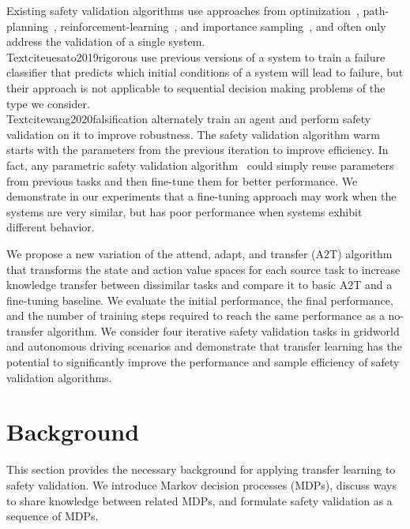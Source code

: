 Existing safety validation algorithms use approaches from optimization~\cite{Mathesen2019falsification}, path-planning~\cite{zutshi2014multiple}, reinforcement-learning~\cite{lee2015adaptive}, and importance sampling~\cite{huang2017accelerated}, and often only address the validation of a single system. \\Textcite{uesato2019rigorous} use previous versions of a system to train a failure classifier that predicts which initial conditions of a system will lead to failure, but their approach is not applicable to sequential decision making problems of the type we consider. \\Textcite{wang2020falsification} alternately train an agent and perform safety validation on it to improve robustness. The safety validation algorithm warm starts with the parameters from the previous iteration to improve efficiency. In fact, any parametric safety validation algorithm~\cite{koren2018adaptive, Akazaki2018falsification, kim2016improving} could simply reuse parameters from previous tasks and then fine-tune them for better performance. We demonstrate in our experiments that a fine-tuning approach may work when the systems are very similar, but has poor performance when systems exhibit different behavior.

We propose a new variation of the attend, adapt, and transfer (A2T) algorithm~\cite{rajendran2017attend} that transforms the state and action value spaces for each source task to increase knowledge transfer between dissimilar tasks and compare it to basic A2T and a fine-tuning baseline. We evaluate the initial performance, the final performance, and the number of training steps required to reach the same performance as a no-transfer algorithm. We consider four iterative safety validation tasks in gridworld and autonomous driving scenarios and demonstrate that transfer learning has the potential to significantly improve the performance and sample efficiency of safety validation algorithms.


\section{Background}
This section provides the necessary background for applying transfer learning to safety validation. We introduce Markov decision processes (MDPs), discuss ways to share knowledge between related MDPs, and formulate safety validation as a sequence of MDPs.

